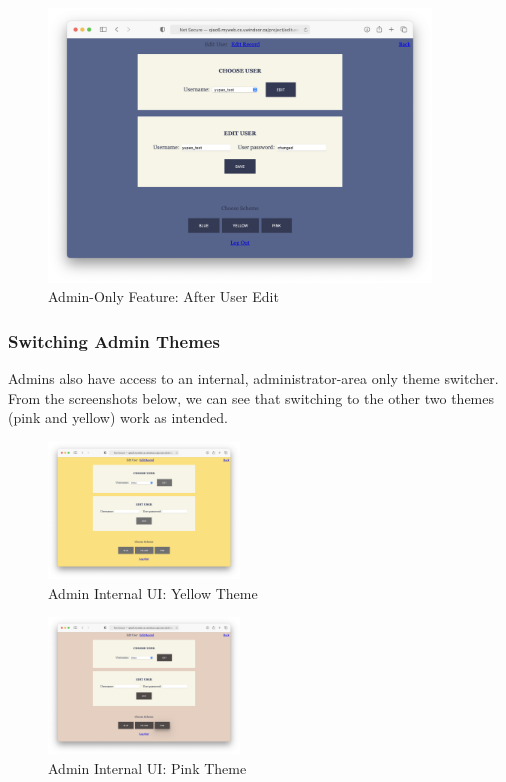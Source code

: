 \documentclass[12pt, letterpaper]{article}
\begin{document}
\begin{figure}[htbp]
\centering
\includegraphics[width=4in]{images/30-journey-a02b.png}
\caption{Admin-Only Feature: After User Edit}
\end{figure}

\newpage
\subsubsection*{Switching Admin Themes}
Admins also have access to an internal, administrator-area only theme switcher. From the screenshots below, we can see that switching to the other two themes (pink and yellow) work as intended.

\begin{figure}[htbp]
\centering
\includegraphics[width=2in]{images/30-journey-a03a.png}
\caption{Admin Internal UI: Yellow Theme}
\end{figure}

\begin{figure}[htbp]
\centering
\includegraphics[width=2in]{images/30-journey-a03b.png}
\caption{Admin Internal UI: Pink Theme}
\end{figure}
\end{document}
